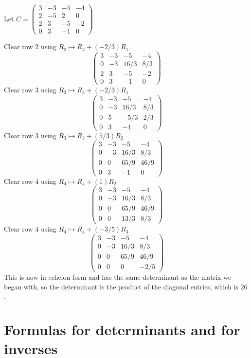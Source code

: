 \documentclass{article}
\begin{document}
\begin{Example}
Let \(C=\begin{pmatrix} 3 & -3 & -5 & -4 \\ 2 & -5 & 2 & 0 \\ 2 & 3
& -5 & -2 \\ 0 & 3 & -1 & 0 \end{pmatrix}\).


Clear row \(2\) using \(R_2\mapsto R_2+(-2/3)R_1\)\[\begin{pmatrix}
3 & -3 & -5 & -4 \\ 0 & -3 & 16/3 & 8/3 \\ 2 & 3 & -5 & -2 \\ 0 & 3
& -1 & 0 \end{pmatrix}\] Clear row \(3\) using \(R_3\mapsto
R_3+(-2/3)R_1\)\[\begin{pmatrix} 3 & -3 & -5 & -4 \\ 0 & -3 & 16/3 &
8/3 \\ 0 & 5 & -5/3 & 2/3 \\ 0 & 3 & -1 & 0 \end{pmatrix}\] Clear
row \(3\) using \(R_3\mapsto R_3+(5/3)R_2\)\[\begin{pmatrix} 3 & -3
& -5 & -4 \\ 0 & -3 & 16/3 & 8/3 \\ 0 & 0 & 65/9 & 46/9 \\ 0 & 3 &
-1 & 0 \end{pmatrix}\] Clear row \(4\) using \(R_4\mapsto
R_4+(1)R_2\)\[\begin{pmatrix} 3 & -3 & -5 & -4 \\ 0 & -3 & 16/3 &
8/3 \\ 0 & 0 & 65/9 & 46/9 \\ 0 & 0 & 13/3 & 8/3 \end{pmatrix}\]
Clear row \(4\) using \(R_4\mapsto R_4+(-3/5)R_3\)\[\begin{pmatrix}
3 & -3 & -5 & -4 \\ 0 & -3 & 16/3 & 8/3 \\ 0 & 0 & 65/9 & 46/9 \\ 0
& 0 & 0 & -2/5 \end{pmatrix}\]This is now in echelon form and has
the same determinant as the matrix we began with, so the determinant
is the product of the diagonal entries, which is \(26\).


\end{Example}
\clearpage
\section{Formulas for determinants and for inverses}
\end{document}

